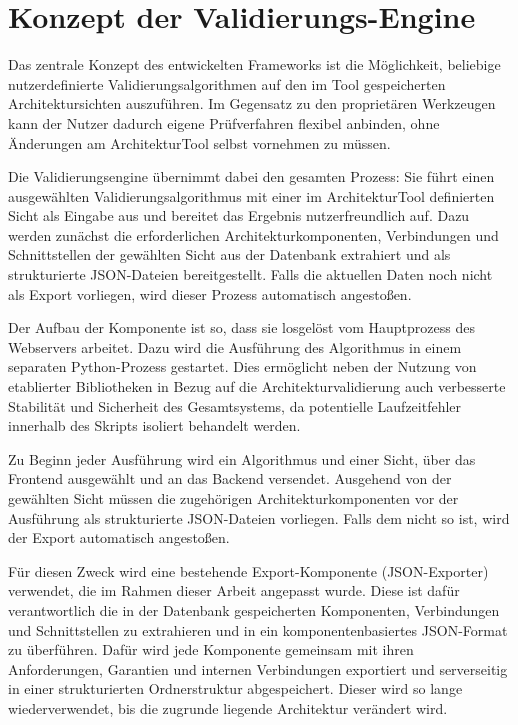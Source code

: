 \section{Konzept der Validierungs-Engine}
\label{sect:K_engine}
Das zentrale Konzept des entwickelten Frameworks ist die Möglichkeit, beliebige nutzerdefinierte Validierungsalgorithmen auf den im Tool gespeicherten Architektursichten auszuführen. Im Gegensatz zu den proprietären Werkzeugen kann der Nutzer dadurch eigene Prüfverfahren flexibel anbinden, ohne Änderungen am ArchitekturTool selbst vornehmen zu müssen.

Die Validierungsengine übernimmt dabei den gesamten Prozess: Sie führt einen ausgewählten Validierungsalgorithmus mit einer im ArchitekturTool definierten Sicht als Eingabe aus und bereitet das Ergebnis nutzerfreundlich auf. Dazu werden zunächst die erforderlichen Architekturkomponenten, Verbindungen und Schnittstellen der gewählten Sicht aus der Datenbank extrahiert und als strukturierte JSON-Dateien bereitgestellt. Falls die aktuellen Daten noch nicht als Export vorliegen, wird dieser Prozess automatisch angestoßen.

Der Aufbau der Komponente ist so, dass sie losgelöst vom Hauptprozess des Webservers arbeitet. Dazu wird die Ausführung des Algorithmus in einem separaten Python-Prozess gestartet. Dies ermöglicht neben der Nutzung von etablierter Bibliotheken in Bezug auf die Architekturvalidierung auch verbesserte Stabilität und Sicherheit des Gesamtsystems, da potentielle Laufzeitfehler innerhalb des Skripts isoliert behandelt werden.

Zu Beginn jeder Ausführung wird ein Algorithmus und einer Sicht, über das Frontend ausgewählt und an das Backend versendet. Ausgehend von der gewählten Sicht müssen die zugehörigen Architekturkomponenten vor der Ausführung als strukturierte JSON-Dateien vorliegen. Falls dem nicht so ist, wird der Export automatisch angestoßen.

Für diesen Zweck wird eine bestehende Export-Komponente (JSON-Exporter) verwendet, die im Rahmen dieser Arbeit angepasst wurde. Diese ist dafür verantwortlich die in der Datenbank gespeicherten Komponenten, Verbindungen und Schnittstellen zu extrahieren und in ein komponentenbasiertes JSON-Format zu überführen. Dafür wird jede Komponente gemeinsam mit ihren Anforderungen, Garantien und internen Verbindungen exportiert und serverseitig in einer strukturierten Ordnerstruktur abgespeichert. Dieser wird so lange wiederverwendet, bis die zugrunde liegende Architektur verändert wird.

